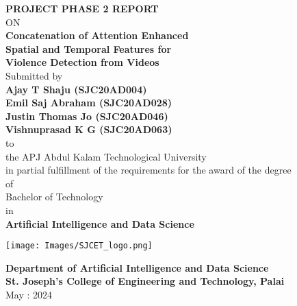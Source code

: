 
\setcounter{page}{1}


\newpage
\thispagestyle{empty}
\begin{center}
  {\large \bf PROJECT PHASE 2 REPORT}\\
ON\\
  \vspace{0.5 cm}
  {\LARGE \bf Concatenation of Attention Enhanced}\\ 
  \vspace{2mm}
  {\LARGE \bf Spatial and Temporal Features for}\\
  \vspace{2mm}
  {\LARGE \bf Violence Detection from Videos}\\
   \vspace{0.5 cm}
   \large Submitted by\\
   { \bf Ajay T Shaju (SJC20AD004)}\\
   { \bf Emil Saj Abraham (SJC20AD028)}\\
   { \bf Justin Thomas Jo (SJC20AD046)}\\
   { \bf Vishnuprasad K G (SJC20AD063)}\\[-0.6mm]
  {\large to\\[-0.6mm] the APJ Abdul Kalam Technological University\\[-0.6mm] in partial fulfillment of the requirements for the award of the degree\\[-0.6mm] of\\[-0.6mm] Bachelor of Technology\\[-0.6mm] in\\[-0.6mm] {\bf Artificial Intelligence and Data Science}}
  
   \begin{center}
   \texttt{[image: Images/SJCET\_logo.png]}
   \end{center}

  {\large {\bf Department of Artificial Intelligence and Data Science}\\
          [-3mm] {\bf St. Joseph's College of Engineering and Technology, Palai}\\
           [1mm]  May : 2024}

\end{center}
